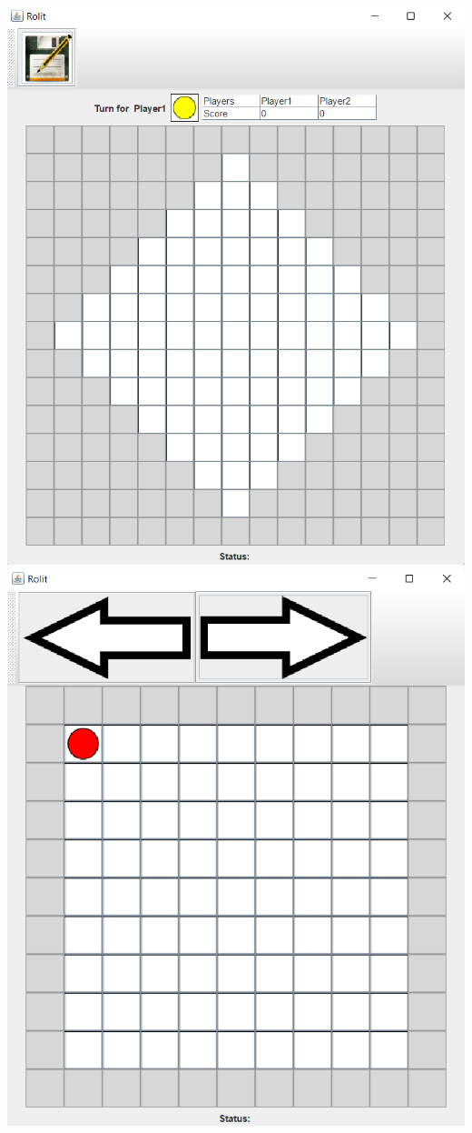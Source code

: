 \documentclass[../DocumentoOficial.tex]{subfiles}
\begin{document}
\begin{sprint}[4]
\begin{center}
\begin{multicols}{2}
\includegraphics[scale=0.3]{game-sprint3.png}\\
\includegraphics[scale=0.3]{replay-sprint3.png}
\end{multicols}
\end{center}


\end{sprint}
\end{document}
